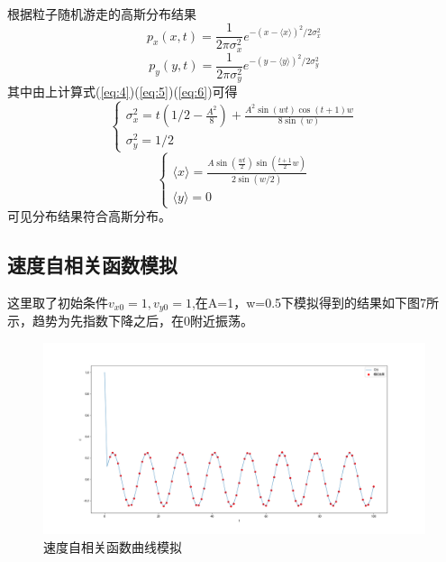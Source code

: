 \documentclass{article}
\begin{document}
~\\
根据粒子随机游走的高斯分布结果
\begin{equation}
	p_x(x,t)=\frac{1}{2\pi\sigma_x^2}e^{-(x-\langle x\rangle)^2/2\sigma_x^2}
\end{equation}
\begin{equation}
	p_y(y,t)=\frac{1}{2\pi\sigma_y^2}e^{-(y-\langle y\rangle)^2/2\sigma_y^2}
\end{equation}
其中由上计算式(\ref{eq:4})(\ref{eq:5})(\ref{eq:6})可得
\begin{equation}
	\begin{cases}
		\sigma_x^2=t(1/2-\frac{A^2}{8})+\frac{A^2\sin(wt)\cos(t+1)w}{8\sin(w)}\\
		\sigma_y^2=1/2
	\end{cases}
\end{equation}
\begin{equation}
	\begin{cases}
		\langle x\rangle=\frac{A\sin(\frac{wt}{2})\sin(\frac{t+1}{2}w)}{2\sin(w/2)}\\
		\langle y\rangle=0
	\end{cases}
\end{equation}
可见分布结果符合高斯分布。
\subsection{速度自相关函数模拟}
这里取了初始条件$ v_{x0}=1,v_{y0}=1 $,在A=1，w=0.5下模拟得到的结果如下图7所示，趋势为先指数下降之后，在0附近振荡。
\begin{figure}[!h]
	
	\centering
	\includegraphics[scale=0.4]{C}
	\caption{\heiti{}速度自相关函数曲线模拟}
	
\end{figure}
\end{document}
